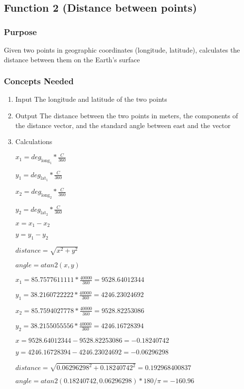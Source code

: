 \documentclass[11pt]{article}
\begin{document}
\subsection{Function 2 (Distance between points)}
\label{sec:orgf80e226}
\subsubsection{Purpose}
\label{sec:org6eb4796}
Given two points in geographic coordinates (longitude, latitude), calculates the
distance between them on the Earth's surface

\subsubsection{Concepts Needed}
\label{sec:orga7375a2}
\begin{enumerate}
\item Input
\label{sec:orgc0c06cc}
The longitude and latitude of the two points

\item Output
\label{sec:org9eff13f}
The distance between the two points in meters, the components of the distance
vector, and the standard angle between east and the vector

\item Calculations
\label{sec:orgffb798c}

\(x_1 = deg_\mathrm{long_1} * \frac{C}{360}\)

\(y_1 = deg_\mathrm{lat_1} * \frac{C}{360}\)

\(x_2 = deg_\mathrm{long_2} * \frac{C}{360}\)

\(y_2 = deg_\mathrm{lat_2} * \frac{C}{360}\)

\(x = x_1 - x_2\)

\(y = y_1 - y_2\)

\(distance = \sqrt{x ^ 2 + y ^ 2}\)

\(angle = atan2(x, y)\)

\(x_1 = 85.7577611111 * \frac{40000}{360} = 9528.64012344\)

\(y_1 = 38.2160722222 * \frac{40000}{360} = 4246.23024692\)

\(x_2 = 85.7594027778 * \frac{40000}{360} = 9528.82253086\)

\(y_2 = 38.2155055556 * \frac{40000}{360} = 4246.16728394\)

\(x = 9528.64012344 - 9528.82253086 = -0.18240742\)

\(y = 4246.16728394 - 4246.23024692 = -0.06296298\)

\(distance = \sqrt{0.06296298 ^ 2 + 0.18240742 ^ 2} = 0.192968400837\)

\(angle = atan2(0.18240742, 0.06296298) * 180 / \pi = -160.96\)
\end{enumerate}
\end{document}
